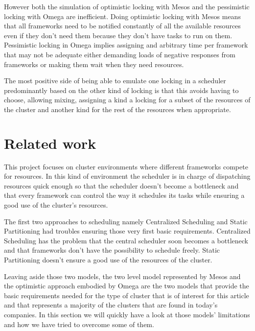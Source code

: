 \documentclass{report}                     %
\begin{document}
However both the simulation of optimistic locking with Mesos and the
pessimistic locking with Omega are inefficient. Doing optimistic
locking with Mesos means that all frameworks need to be notified
constantly of all the available resources even if they don't need them
because they don't have tasks to run on them. Pessimistic locking in
Omega implies assigning and arbitrary time per framework that may not
be adequate either demanding loads of negative responses from
frameworks or making them wait when they need resources. 

The most positive side of being able to emulate one locking in a
scheduler predominantly based on the other kind of locking is that
this avoids having to choose, allowing mixing, assigning a kind a
locking for a subset of the resources of the cluster and another kind
for the rest of the resources when appropriate.





\chapter{Related work}

This project focuses on cluster environments where different
frameworks compete for resources. In this kind of environment the
scheduler is in charge of dispatching resources quick enough
so that the scheduler doesn't become a bottleneck and that every
framework can control the way it schedules its tasks while ensuring
a good use of the cluster's resources. 

The first two approaches to scheduling namely Centralized Scheduling
and Static Partitioning had troubles ensuring those very first basic
requirements. Centralized Scheduling has the problem that the central
scheduler soon becomes a bottleneck and that frameworks don't have
the possibility to schedule freely. Static Partitioning doesn't ensure a good
use of the resources of the cluster.

Leaving aside those two models, the two level model represented by
Mesos and the optimistic approach embodied by Omega are the
two models that provide the basic requirements needed for the type of
cluster that is of interest for this article and that represents a
majority of the clusters that are found in today's companies. In this
section we will quickly have a look at those models' limitations and
how we have tried to overcome some of them.
\end{document}
